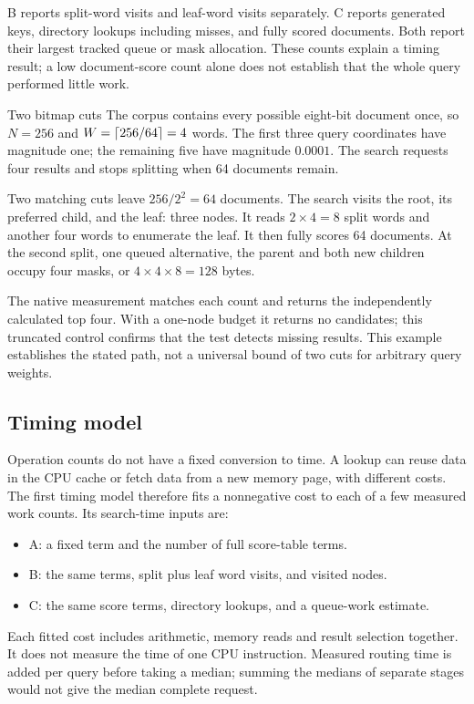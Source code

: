 B reports split-word visits and leaf-word visits separately. C reports generated keys, directory
lookups including misses, and fully scored documents. Both report their largest tracked queue
or mask allocation. These counts explain a timing result; a low document-score count alone does
not establish that the whole query performed little work.

\begin{examplebox}{Two bitmap cuts}
The corpus contains every possible eight-bit document once, so $N=256$ and $W=\left\lceil 256/64\right\rceil=4$ words.
The first three query coordinates have magnitude one; the remaining five have magnitude
$0.0001$. The search requests four results and stops splitting when 64 documents remain.

Two matching cuts leave $256/2^2=64$ documents. The search visits the root, its preferred child,
and the leaf: three nodes. It reads $2\times4=8$ split words and another four words to enumerate
the leaf. It then fully scores 64 documents. At the second split, one queued alternative,
the parent and both new children occupy four masks, or $4\times4\times8=128$ bytes.

The native measurement matches each count and returns the independently calculated top four.
With a one-node budget it returns no candidates; this truncated control confirms that
the test detects missing results. This example establishes the stated path, not a universal
bound of two cuts for arbitrary query weights.
\end{examplebox}

\subsection{Timing model}
Operation counts do not have a fixed conversion to time. A lookup can reuse data
in the CPU cache or fetch data from a new memory page, with different costs.
The first timing model therefore fits a nonnegative cost to each of a few measured work counts. Its search-time inputs are:
\begin{itemize}
\item A: a fixed term and the number of full score-table terms.
\item B: the same terms, split plus leaf word visits, and visited nodes.
\item C: the same score terms, directory lookups, and a queue-work estimate.
\end{itemize}
Each fitted cost includes arithmetic, memory reads and result selection together. It does
not measure the time of one CPU instruction. Measured routing time is added per query before taking
a median; summing the medians of separate stages would not give the median complete request.

